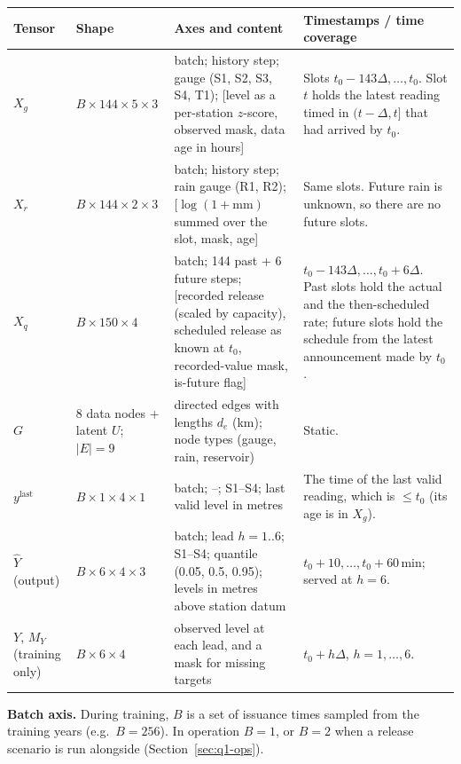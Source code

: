 {\small
\begin{longtable}{@{}p{}p{}p{}p{}@{}}
\toprule
Tensor & Shape & Axes and content & Timestamps / time coverage \\ \midrule
\endhead
$X_g$ & $B\times144\times5\times3$ & batch; history step; gauge (S1, S2, S3, S4, T1); [level as a per-station $z$-score, observed mask, data age in hours] & Slots $t_0-143\Delta,\dots,t_0$. Slot $t$ holds the latest reading timed in $(t-\Delta,t]$ that had arrived by $t_0$. \\
$X_r$ & $B\times144\times2\times3$ & batch; history step; rain gauge (R1, R2); [$\log(1+\text{mm})$ summed over the slot, mask, age] & Same slots. Future rain is unknown, so there are no future slots. \\
$X_q$ & $B\times150\times4$ & batch; 144 past + 6 future steps; [recorded release (scaled by capacity), scheduled release as known at $t_0$, recorded-value mask, is-future flag] & $t_0-143\Delta,\dots,t_0+6\Delta$. Past slots hold the actual and the then-scheduled rate; future slots hold the schedule from the latest announcement made by $t_0$. \\
$G$ & 8 data nodes + latent $U$; $|E| = 9$ & directed edges with lengths $d_e$ (km); node types (gauge, rain, reservoir) & Static. \\
$y^{\text{last}}$ & $B\times1\times4\times1$ & batch; --; S1--S4; last valid level in metres & The time of the last valid reading, which is $\le t_0$ (its age is in $X_g$). \\
$\hat Y$ (output) & $B\times6\times4\times3$ & batch; lead $h=1..6$; S1--S4; quantile (0.05, 0.5, 0.95); levels in metres above station datum & $t_0+10,\dots,t_0+60$\,min; served at $h=6$. \\
$Y$, $M_Y$ (training only) & $B\times6\times4$ & observed level at each lead, and a mask for missing targets & $t_0+h\Delta$, $h=1,\dots,6$. \\
\bottomrule
\end{longtable}
}

\textbf{Batch axis.} During training, $B$ is a set of issuance times sampled from the training years
(e.g.\ $B=256$). In operation $B=1$, or $B=2$ when a release scenario is run alongside (Section~\ref{sec:q1-ops}).

